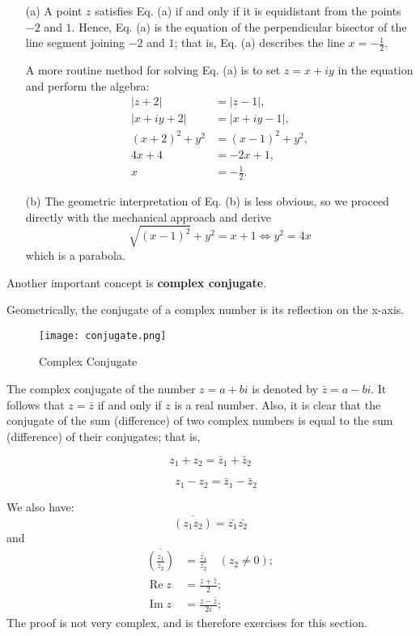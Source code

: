 \begin{itemize}
    \item[(a)] A point \( z \) satisfies Eq. (a) if and only if it is equidistant from the points \( -2 \) and \( 1 \). Hence, Eq. (a) is the equation of the perpendicular bisector of the line segment joining \( -2 \) and \( 1 \); that is, Eq. (a) describes the line \( x = -\frac{1}{2} \).

    A more routine method for solving Eq. (a) is to set \( z = x + iy \) in the equation and perform the algebra:
    \begin{align*}
        |z + 2| &= |z - 1|, \\
        |x + iy + 2| &= |x + iy - 1|, \\
        (x + 2)^2 + y^2 &= (x - 1)^2 + y^2, \\
        4x + 4 &= -2x + 1, \\
        x &= -\frac{1}{2}.
    \end{align*}

    \item[(b)] The geometric interpretation of Eq. (b) is less obvious, so we proceed directly with the mechanical approach and derive
    $$\sqrt{(x-1)^2} + y^2 = x+1 \iff y^2 = 4x$$
    which is a parabola.
\end{itemize}
Another important concept is \textbf{complex conjugate}.

Geometrically, the conjugate of a complex number is its reflection on the x-axis.
\begin{wrapfigure}{r}{0.5\textwidth}
    \centering
    \texttt{[image: conjugate.png]}
    \caption{Complex Conjugate}
  \end{wrapfigure}
  The complex conjugate of the number $z = a+bi$ is denoted by $\bar{z} = a-bi $.
  It follows that \( z = \bar{z} \) if and only if \( z \) is a real number. Also, it is clear that the conjugate of the sum (difference) of two complex numbers is equal to the sum (difference) of their conjugates; that is,

$$z_1 + z_2 = \bar{z}_1 + \bar{z}_2$$

$$\quad z_1 - z_2 = \bar{z}_1 - \bar{z}_2$$

We also have:
$$\bar{(z_1z_2)} = \bar{z_1} \bar{z_2}$$
and
$$\begin{aligned}\overline{\left(\frac{z_1}{z_2}\right)}&=\frac{\bar{z_1}}{\bar{z_2}}\quad(z_2\neq0);\\\operatorname{Re}z&=\frac{z+\bar{z}}2;\\\operatorname{Im}z&=\frac{z-\bar{z}}{2i};\end{aligned}$$
The proof is not very complex, and is therefore exercises for this section.
\\
